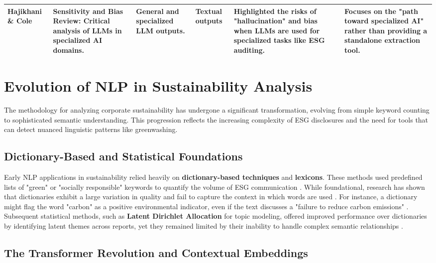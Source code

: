 \begin{landscape}
\begin{table}[p]
\begin{tabularx}{\linewidth}{|p{1.8cm}|X|X|p{1.8cm}|X|X|}
\textbf{Hajikhani \& Cole}  \parencite{arash_hajikhani_cbb2528f} & \textbf{Sensitivity and Bias Review}: Critical analysis of LLMs in specialized AI domains. & General and specialized LLM outputs. & Textual outputs & Highlighted the risks of "hallucination" and bias when LLMs are used for specialized tasks like ESG auditing. & Focuses on the "path toward specialized AI" rather than providing a standalone extraction tool. \\ \hline
\end{tabularx}
\end{table}
\end{landscape}
\section{ Evolution of NLP in Sustainability Analysis}

The methodology for analyzing corporate sustainability has undergone a significant transformation, evolving from simple keyword counting to sophisticated semantic understanding. This progression reflects the increasing complexity of ESG disclosures and the need for tools that can detect nuanced linguistic patterns like greenwashing.
\subsection{Dictionary-Based and Statistical Foundations}

Early NLP applications in sustainability relied heavily on \textbf{dictionary-based techniques} and \textbf{lexicons}. These methods used predefined lists of "green" or "socially responsible" keywords to quantify the volume of ESG communication  \parencite{frederik_maibaum_b8629037}. While foundational, research has shown that dictionaries exhibit a large variation in quality and fail to capture the context in which words are used  \parencite{frederik_maibaum_b8629037}. For instance, a dictionary might flag the word "carbon" as a positive environmental indicator, even if the text discusses a "failure to reduce carbon emissions"  \parencite{julia_bingler_268445e3}. Subsequent statistical methods, such as \textbf{Latent Dirichlet Allocation} for topic modeling, offered improved performance over dictionaries by identifying latent themes across reports, yet they remained limited by their inability to handle complex semantic relationships  \parencite{frederik_maibaum_b8629037}.
\subsection{The Transformer Revolution and Contextual Embeddings}

